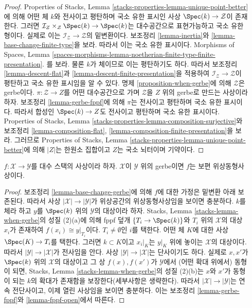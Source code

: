 \begin{proof}
Properties of Stacks, Lemma
\ref{stacks-properties-lemma-unique-point-better}에 의해 어떤 체 $k$와
전사이고 평탄하며 국소 유한 표시인 사상
$\Spec(k) \to \mathcal{Z}$이 존재한다. 그러면
$\mathcal{I}_Z \times_\mathcal{Z} \Spec(k) \to \Spec(k)$는 대수공간으로
표현가능하고 국소 유한형이다.%
실제로 이는 $\mathcal{I}_\mathcal{Z} \to \mathcal{Z}$의 밑변환이다.
보조정리 \ref{lemma-inertia}와 \ref{lemma-base-change-finite-type}을 보라.
따라서 이는 국소 유한 표시이다. Morphisms of Spaces, Lemma
\ref{spaces-morphisms-lemma-noetherian-finite-type-finite-presentation}.
를 보라. 물론 $k$가 체이므로 이는 평탄하기도 하다. 따라서 보조정리
\ref{lemma-descent-flat}과 \ref{lemma-descent-finite-presentation}을
적용하여 $\mathcal{I}_\mathcal{Z} \to \mathcal{Z}$이 평탄하고 국소 유한
표시임을 알 수 있다. 명제 \ref{proposition-when-gerbe}에 의해
$\mathcal{Z}$은 gerbe이다. $\pi : \mathcal{Z} \to Z$를 어떤
대수공간으로 가며 $\mathcal{Z}$을 $Z$ 위의 gerbe로 만드는 사상이라
하자. 보조정리 \ref{lemma-gerbe-fppf}에 의해 $\pi$는 전사이고 평탄하며
국소 유한 표시이다. 따라서 합성인 $\Spec(k) \to Z$도 전사이고 평탄하며
국소 유한 표시이다. Properties of Stacks, Lemma
\ref{stacks-properties-lemma-composition-surjective}와 보조정리
\ref{lemma-composition-flat},
\ref{lemma-composition-finite-presentation}을 보라. 그러므로 Properties of
Stacks, Lemma \ref{stacks-properties-lemma-unique-point-better}에 의해
$|Z|$는 한원소 집합이고 $Z$는 국소 뇌터이며 기약이다.
\end{proof}

\begin{lemma}
\label{lemma-gerbe-bijection-points}
$f : \mathcal{X} \to \mathcal{Y}$를 대수 스택의 사상이라 하자.
$\mathcal{X}$이 $\mathcal{Y}$ 위의 gerbe이면 $f$는 보편
위상동형사상이다.
\end{lemma}

\begin{proof}
보조정리 \ref{lemma-base-change-gerbe}에 의해 $f$에 대한 가정은
밑변환 아래 보존된다. 따라서 사상
$|\mathcal{X}| \to |\mathcal{Y}|$가 위상공간의 위상동형사상임을 보이면
충분하다. $k$를 체라 하고 $y$를 $\Spec(k)$ 위의 $\mathcal{Y}$의
대상이라 하자. Stacks, Lemma \ref{stacks-lemma-when-gerbe}의 성질
(2)(a)에 의해 fppf 덮개 $\{T_i \to \Spec(k)\}$와 $T_i$ 위의
$\mathcal{X}$의 대상 $x_i$가 존재하여 $f(x_i) \cong y|_{T_i}$이다.
$T_i \not = \emptyset$인 $i$를 택한다. 어떤 체 $K$에 대한 사상
$\Spec(K) \to T_i$를 택한다. 그러면 $k \subset K$이고 $x_i|_K$는
$y|_K$ 위에 놓이는 $\mathcal{X}$의 대상이다. 따라서
$|\mathcal{Y}| \to |\mathcal{X}|$가 전사임을 안다.%
사상 $|\mathcal{Y}| \to |\mathcal{X}|$는 단사이기도 하다. 실제로
$x, x'$가 $\Spec(k)$ 위의 $\mathcal{X}$의 대상이고 그 상
$f(x), f(x')$가 $\mathcal{Y}$에서 (어떤 확대 위에서) 동형이 되면,
Stacks, Lemma \ref{stacks-lemma-when-gerbe}의 성질 (2)(b)는 $x$와 $x'$가
동형이 되는 $k$의 확대가 존재함을 보장한다(세부사항은 생략한다).
따라서 $|\mathcal{X}| \to |\mathcal{Y}|$는 연속 전단사이고, 이제 열린
사상임을 보이면 충분하다. 이는 보조정리 \ref{lemma-gerbe-fppf}와
\ref{lemma-fppf-open}에서 따른다.
\end{proof}

